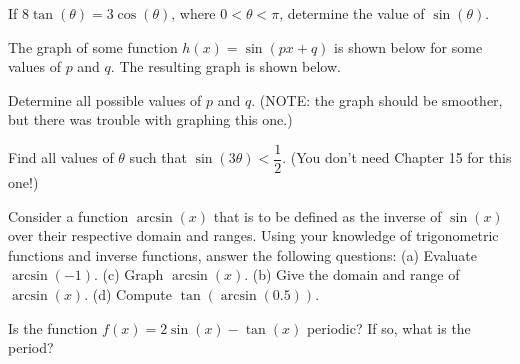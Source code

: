 \documentclass[../book.tex]{subfiles}
\begin{document}
\begin{challengeset}
\item If $8\tan(\theta)=3\cos(\theta)$, where $0<\theta<\pi$, determine the value of $\sin(\theta)$. \vspace{3mm}
\item The graph of some function $h(x)=\sin(px+q)$ is shown below for some values of $p$ and $q$. The resulting graph is shown below.

\begin{figure}[!ht]
    \centering
\end{figure}

Determine all possible values of $p$ and $q$. (NOTE: the graph should be smoother, but there was trouble with graphing this one.) \vspace{3mm}
\item Find all values of $\theta$ such that $\sin(3\theta)<\dfrac{1}{2}$. (You don't need Chapter 15 for this one!) \vspace{3mm}
\item Consider a function $\arcsin(x)$ that is to be defined as the inverse of $\sin(x)$ over their respective domain and ranges.  Using your knowledge of trigonometric functions and inverse functions, answer the following questions: \newline 
(a) Evaluate $\arcsin(-1)$.  (c) Graph $\arcsin(x)$.  \newline 
(b) Give the domain and range of $\arcsin(x)$.  (d) Compute $\tan(\arcsin(0.5))$. \vspace{3mm}
\item Is the function $f(x)=2\sin(x)-\tan(x)$ periodic? If so, what is the period? \vspace{3mm}
\end{challengeset}
\end{document}
